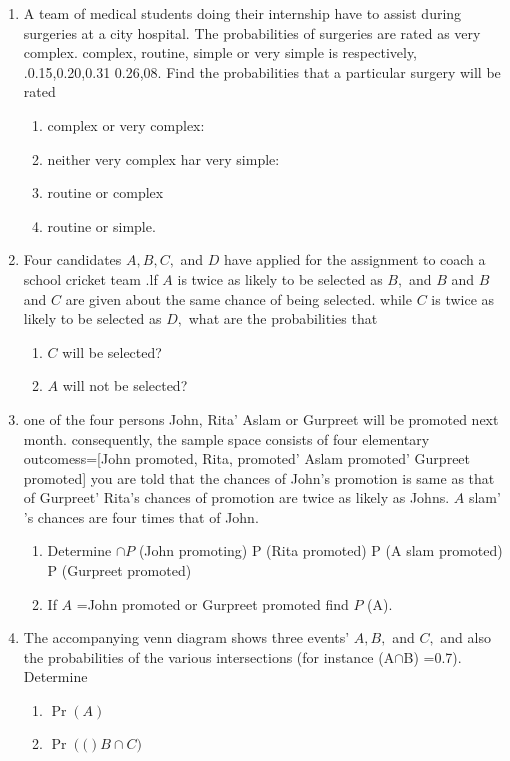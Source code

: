 \documentclass[12pt]{article}
\providecommand{\pr}[1]{\ensuremath{\Pr\left(#1\right)}}
\begin{document}
\begin{enumerate}
\begin{enumerate}
	\end{enumerate}
\item A team of medical students doing their internship have to assist during surgeries at a city hospital. The probabilities of surgeries are rated as very complex. complex, routine, simple or very simple is respectively, .0.15,0.20,0.31 0.26,08. Find the probabilities that a particular surgery will be rated
	\begin{enumerate}
\item complex or very complex:
\item neither very complex har very simple:
\item routine or complex 
\item routine or simple.
	\end{enumerate}
\item Four candidates $A, B, C,$ and $D$ have applied for the assignment to coach a school cricket team .lf $A$ is twice as likely to be selected as $B,$ and $B$ and $B$ and $C$ are given about the same chance of being selected. while $C$ is twice as likely to be selected as $D,$ what are the probabilities that
\begin{enumerate}
\item $C$ will be selected?
\item $A$ will not be selected?
\end{enumerate}
\item one of the four persons John, Rita' Aslam or Gurpreet will be promoted next month. consequently, the sample space consists of four elementary outcomess=[John promoted, Rita, promoted' Aslam promoted' Gurpreet promoted] you are told that the chances of John's promotion is same as that of Gurpreet' Rita's chances of promotion are twice as likely as Johns. $A$ slam' 's chances are four times that of John.
	\begin{enumerate}
\item Determine $\cap{P}$ (John promoting)
 P (Rita promoted)
 P (A slam promoted)
 P (Gurpreet promoted)
\item  If $A$ ={John promoted or Gurpreet promoted} find $P$ (A).
	\end{enumerate}
\item The accompanying venn diagram shows three events' $A, B,$ and $C,$ and also the probabilities of the various intersections (for instance (A$\cap$B) =0.7). Determine
\begin{enumerate}
\item $\pr{A}$
\item $\pr(B\cap C)$

\end{enumerate}
\end{enumerate}
\end{document}
